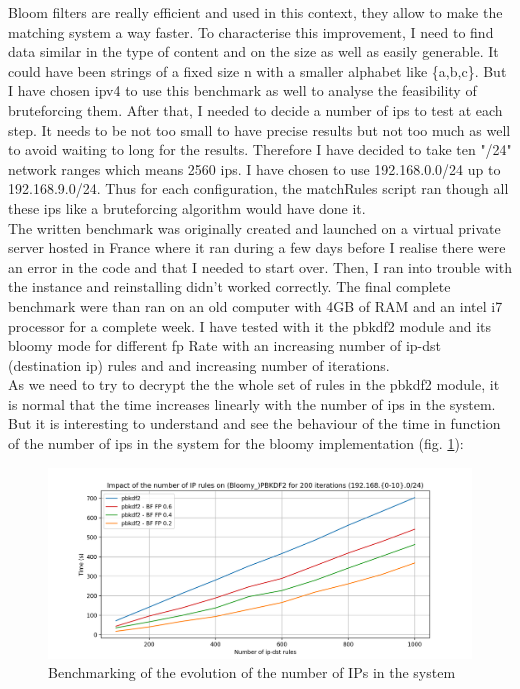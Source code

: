 \documentclass{eplmastersthesis}
\begin{document}
Bloom filters are really efficient and used in this context, they allow to make the matching system a way faster. To characterise this improvement, I need to find data similar in the type of content and on the size as well as easily generable. It could have been strings of a fixed size n with a smaller alphabet like \{a,b,c\}. But I have chosen \gls{ipv4} to use this benchmark as well to analyse the feasibility of  bruteforcing them.
After that, I needed to decide a number of \gls{ip}s to test at each step. It needs to be not too small to have precise results but not too much as well to avoid waiting to long for the results. Therefore I have decided to take ten "/24" network ranges which means 2560 \gls{ip}s. I have chosen to use 192.168.0.0/24 up to 192.168.9.0/24.
Thus for each configuration, the matchRules script ran though all these \gls{ip}s like a bruteforcing algorithm would have done it.\\

The written benchmark was originally created and launched on a virtual private server hosted in France where it ran during a few days before I realise there were an error in the code and that I needed to start over. Then, I ran into trouble with the instance and reinstalling didn't worked correctly.
The final complete benchmark were than ran on an old computer with 4GB of RAM and an intel i7 processor for a complete week.
I have tested with it the \gls{pbkdf2} module and its bloomy mode for different \gls{fp} Rate with an increasing number of ip-dst (destination \gls{ip}) rules and and increasing number of iterations.\\

As we need to try to decrypt the the whole set of rules in the \gls{pbkdf2} module, it is normal that the time increases linearly with the number of \gls{ip}s in the system. But it is interesting to understand and see the behaviour of the time in function of the number of \gls{ip}s in the system for the bloomy implementation (fig. \ref{benchmarking:timeips}):

\begin{figure}[h!]
\begin{center}
	\includegraphics[scale=0.6]{res/TimeIPs}
	\caption{Benchmarking of the evolution of the number of IPs in the system}
	\label{benchmarking:timeips}
\end{center}
\end{figure}
\end{document}
